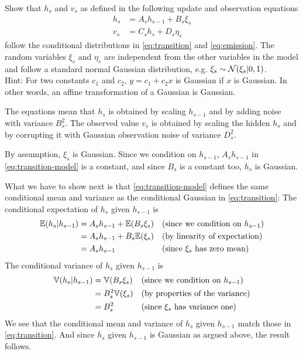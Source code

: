 \begin{exenumerate}

\item Show that $h_s$ and $v_s$ as defined in the following update and
observation equations
\begin{align}
  h_s & = A_s h_{s-1} + B_s \xi_s \label{eq:transition-model}\\
  v_s & = C_s h_s  + D_s \eta_s \label{eq:emission-model}
\end{align}
follow the conditional distributions in \eqref{eq:transition} and
\eqref{eq:emission}. The random variables $\xi_s$ and $\eta_s$ are
independent from the other variables in the model and follow a
standard normal Gaussian distribution, e.g. $\xi_s \sim \mathcal{N}(\xi_s |
0, 1)$.\\ Hint: For two constants $c_1$ and $c_2$, $y = c_1 + c_2 x$
is Gaussian if $x$ is Gaussian. In other words, an affine
transformation of a Gaussian is Gaussian.

The equations mean that $h_s$ is obtained by scaling $h_{s-1}$ and by
adding noise with variance $B_s^2$. The observed value $v_s$ is
obtained by scaling the hidden $h_s$ and by corrupting it with
Gaussian observation noise of variance $D_s^2$.

\begin{solution}

By assumption, $\xi_s$ is Gaussian. Since we condition on $h_{s-1}$,
$A_s h_{s-1}$ in \eqref{eq:transition-model} is a constant, and since
$B_s$ is a constant too, $h_s$ is Gaussian. 

What we have to show next is that \eqref{eq:transition-model} defines
the same conditional mean and variance as the conditional Gaussian in
\eqref{eq:transition}: The conditional expectation of $h_s$ given
$h_{s-1}$ is
\begin{align}
  \mathbb{E}(h_s | h_{s-1}) & = A_s h_{s-1} + \mathbb{E}( B_s \xi_s) &&\text{(since we condition on $h_{s-1}$)}\\
  & = A_s h_{s-1} + B_s \mathbb{E}(\xi_s) && \text{(by linearity of expectation)}\\
  & = A_s h_{s-1} && \text{(since $\xi_s$ has zero mean)}
\end{align}
The conditional variance of $h_s$ given $h_{s-1}$ is
\begin{align}
  \mathbb{V}(h_s | h_{s-1}) & =  \mathbb{V}( B_s \xi_s) &&\text{(since we condition on $h_{s-1}$)}\\
  & = B_s^2 \mathbb{V}(\xi_s) && \text{(by properties of the variance)}\\
  & = B_s^2 && \text{(since $\xi_s$ has variance one)}
\end{align}
We see that the conditional mean and variance of $h_s$ given $h_{s-1}$ match those in
\eqref{eq:transition}. And since $h_s$ given $h_{s-1}$ is Gaussian as argued above,
the result follows.


\end{solution}
\end{exenumerate}
